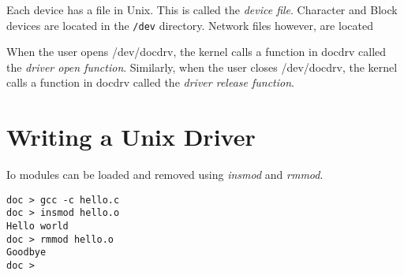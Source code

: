 Each device has a file in Unix. This is called the \textit{device file}.
Character and Block devices are located in the \lstinline{/dev} directory.
Network files however, are located 

When the user opens /dev/docdrv, the kernel calls a function in docdrv called the
\textit{driver open function}. Similarly, when the user closes /dev/docdrv, 
the kernel calls a function in docdrv called the \textit{driver release function}.



\section{Writing a Unix Driver}

Io modules can be loaded and removed using \textit{insmod} and \textit{rmmod}.

\begin{lstlisting}
doc > gcc -c hello.c
doc > insmod hello.o
Hello world
doc > rmmod hello.o
Goodbye
doc >
\end{lstlisting}